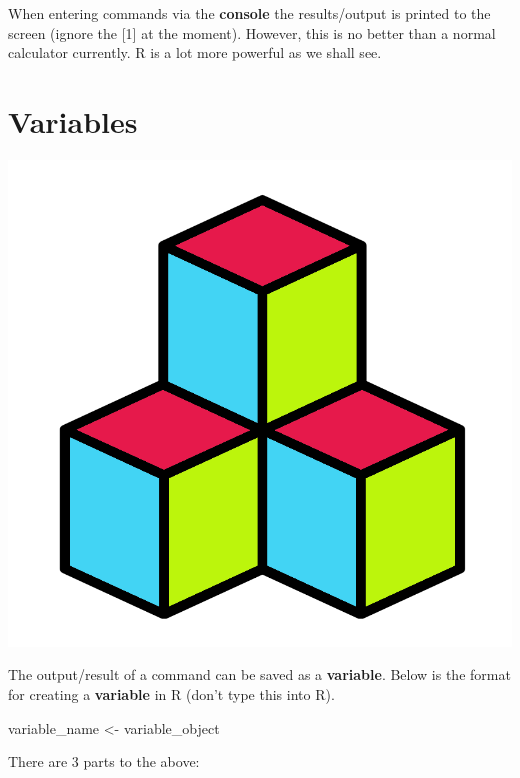 \documentclass[]{book}
\newenvironment{Shaded}{\begin{snugshade}}{\end{snugshade}}
\newcommand{\StringTok}[1]{\textcolor[rgb]{0.31,0.60,0.02}{#1}}
\newcommand{\NormalTok}[1]{#1}
\begin{document}
When entering commands via the \textbf{console} the results/output is
printed to the screen (ignore the {[}1{]} at the moment). However, this
is no better than a normal calculator currently. R is a lot more
powerful as we shall see.

\section{Variables}\label{variables}

\begin{center}\includegraphics[width=0.2\linewidth]{figures/boxes} \end{center}

The output/result of a command can be saved as a \textbf{variable}.
Below is the format for creating a \textbf{variable} in R (don't type
this into R).

\begin{Shaded}
\begin{Highlighting}[]
\NormalTok{variable_name <-}\StringTok{ }\NormalTok{variable_object}
\end{Highlighting}
\end{Shaded}

There are 3 parts to the above:
\end{document}
